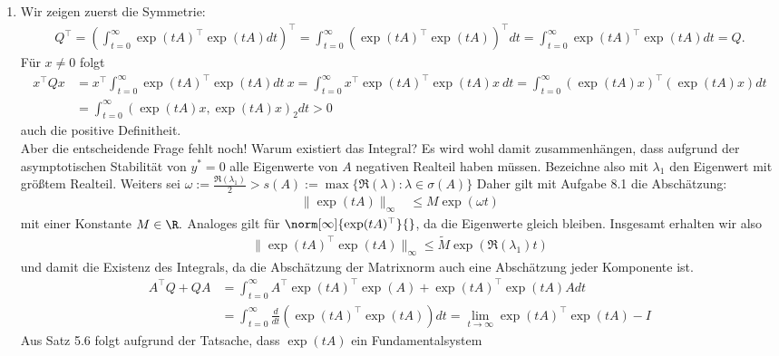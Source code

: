 \begin{solution}
\begin{enumerate}[label = \textbf{\alph*)}]
  \item Wir zeigen zuerst die Symmetrie:
  \begin{align*}
    Q^{\top} = \left(\int_{t = 0}^{\infty} \exp(tA)^{\top}\exp(tA) dt\right)^{\top}
    = \int_{t = 0}^{\infty} \left(\exp(tA)^{\top}\exp(tA)\right)^{\top} dt
    = \int_{t = 0}^{\infty} \exp(tA)^{\top}\exp(tA) dt = Q.
  \end{align*}
  Für $x \neq 0$ folgt
  \begin{align*}
    x^{\top}Qx &= x^{\top}\int_{t = 0}^{\infty} \exp(tA)^{\top}\exp(tA) dt~x
    = \int_{t = 0}^{\infty} x^{\top}\exp(tA)^{\top}\exp(tA) x~ dt
    = \int_{t = 0}^{\infty} (\exp(tA)x)^{\top}(\exp(tA)x) dt \\
    &= \int_{t = 0}^{\infty} (\exp(tA)x,\exp(tA)x)_2 dt > 0
  \end{align*}
  auch die positive Definitheit. \\
  Aber die entscheidende Frage fehlt noch! Warum existiert das Integral?
  Es wird wohl damit zusammenhängen, dass aufgrund der asymptotischen Stabilität
  von $y^* = 0$ alle Eigenwerte von $A$ negativen Realteil haben müssen.
  Bezeichne also mit $\lambda_1$ den Eigenwert mit größtem Realteil.
  Weiters sei $\omega := \frac{\Re(\lambda_1)}{2} > s(A) := \max \{\Re(\lambda): \lambda \in \sigma(A)\}$
  Daher gilt mit Aufgabe 8.1 die Abschätzung:
  \begin{align*}
    \|\exp(tA)\|_{\infty} &\leq  M\exp(\omega t)
  \end{align*}
  mit einer Konstante $M \in \R.$
  Analoges gilt für $\norm[\infty]{\exp(tA)^{\top}}{}$, da die Eigenwerte gleich bleiben. Insgesamt erhalten wir also
  \begin{align*}
    \|\exp(tA)^{\top}\exp(tA)\|_{\infty} \leq \widetilde{M}\exp(\Re(\lambda_1) t)
  \end{align*}
  und damit die Existenz des Integrals, da die Abschätzung der Matrixnorm auch
  eine Abschätzung jeder Komponente ist.
  \begin{align*}
    A^{\top}Q + QA &= \int_{t = 0}^{\infty} A^{\top}\exp(tA)^{\top}\exp(A) + \exp(tA)^{\top}\exp(tA)Adt \\
    &= \int_{t = 0}^{\infty} \frac{d}{dt}(\exp(tA)^{\top}\exp(tA)) dt
    = \lim_{t \to \infty} \exp(tA)^{\top}\exp(tA) - I
  \end{align*}
  Aus Satz 5.6 folgt aufgrund der Tatsache, dass $\exp(tA)$ ein Fundamentalsystem

\end{enumerate}
\end{solution}
